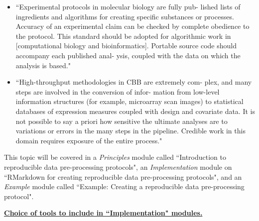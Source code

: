 \documentclass[pdftex,english,11pt,parskip=half]{scrartcl}
\begin{document}
\begin{itemize}
\item ``Experimental protocols in molecular biology are fully pub- lished lists of ingredients and algorithms for creating specific substances or processes. Accuracy of an experimental claim can be checked by complete obedience to the protocol. This standard should be adopted for algorithmic work in [computational biology and bioinformatics]. Portable source code should accompany each published anal- ysis, coupled with the data on which the analysis is based." \cite{gentleman2004bioconductor}
\item ``High-throughput methodologies in CBB are extremely com- plex, and many steps are involved in the conversion of infor- mation from low-level information structures (for example, microarray scan images) to statistical databases of expression measures coupled with design and covariate data. It is not possible to say a priori how sensitive the ultimate analyses are to variations or errors in the many steps in the pipeline. Credible work in this domain requires exposure of the entire process." \cite{gentleman2004bioconductor}
\end{itemize}

This topic will be covered in a \textit{Principles} module called ``Introduction to reproducible data pre-processing protocols", an \textit{Implementation} module on ``RMarkdown
for creating reproducible data pre-processing protocols", and an
\textit{Example} module called ``Example: Creating a reproducible data
pre-processing protocol". 

\underline{\textbf{Choice of tools to include in ``Implementation" modules.}}
\end{document}
